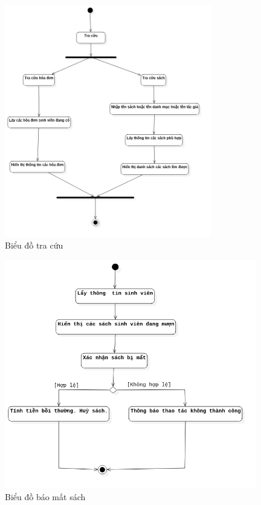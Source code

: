 \documentclass[../report.tex]{subfiles}
\begin{document}
\begin{figure}[H]
\centering
\includegraphics[width=9cm]{figures/tracuu.png}
\caption{Biểu đồ tra cứu}
\end{figure}

\begin{figure}[H]
\centering
\includegraphics[width=11cm]{figures/baomatsach.png}
\caption{Biểu đồ báo mất sách}
\end{figure}
\end{document}
